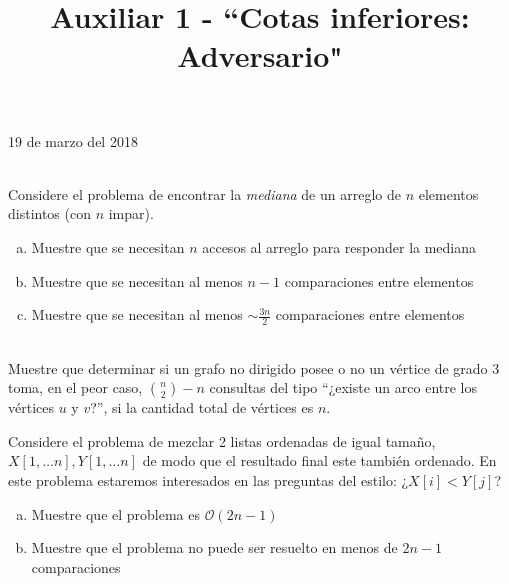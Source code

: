 \documentclass[dcc,uchile]{fcfmcourse}
\title{Auxiliar 1 - ``Cotas inferiores: Adversario"}
\theoremstyle{plain}
\theoremstyle{definition}
\begin{document}
\maketitle
\begin{center}
19 de marzo del 2018
\end{center}


\vspace{-1ex}


\begin{problems}

\\
Considere el problema de encontrar la \textit{mediana} de un arreglo de $n$ elementos distintos (con $n$ impar).
\begin{enumerate}[a)]
    \item Muestre que se necesitan $n$ accesos al arreglo para responder la mediana
    \item Muestre que se necesitan al menos $n-1$ comparaciones entre elementos
    \item Muestre que se necesitan al menos $\sim \frac{3n}{2}$ comparaciones entre elementos
\end{enumerate}

\\
Muestre que determinar si un grafo no dirigido posee o no un vértice de grado $3$ toma, en el peor caso, $\binom{n}{2}-n$ consultas del tipo ``¿existe un arco entre
los vértices $u$ y $v$?'', si la cantidad total de vértices es $n$.



Considere el problema de mezclar 2 listas ordenadas de igual tamaño, $X[1,\ldots n], Y[1,\ldots n]$ de modo que el resultado final este también ordenado. En este problema estaremos interesados en las preguntas del estilo: ¿$X[i]<Y[j]$?
\begin{enumerate}[a)]
    \item Muestre que el problema es $\mathcal{O}(2n-1)$
    \item Muestre que el problema no puede ser resuelto en menos de $2n-1$ comparaciones
\end{enumerate}

\end{problems}
\end{document}
